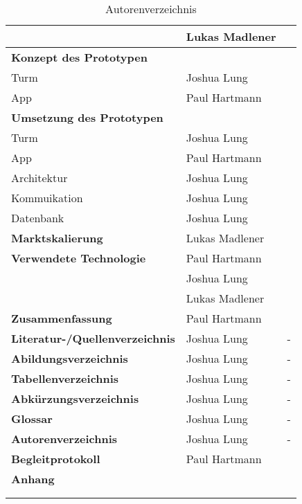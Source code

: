 \begin{longtable}{l|l|r}
                                         & Lukas Madlener &                     \\ \hline
  \textbf{Konzept des Prototypen}        &                &                     \\ \hline
  Turm                                   & Joshua Lung    &                     \\ \hline
  App                                    & Paul Hartmann  &                     \\ \hline
  \textbf{Umsetzung des Prototypen}      &                &                     \\ \hline
  Turm                                   & Joshua Lung    &                     \\ \hline
  App                                    & Paul Hartmann  &                     \\ \hline
  Architektur                            & Joshua Lung    &                     \\ \hline
  Kommuikation                           & Joshua Lung    &                     \\ \hline
  Datenbank                              & Joshua Lung    &                     \\ \hline
  \textbf{Marktskalierung}               & Lukas Madlener &                     \\ \hline
  \textbf{Verwendete Technologie}        & Paul Hartmann  &                     \\
                                         & Joshua Lung    &                     \\
                                         & Lukas Madlener &                     \\ \hline
  \textbf{Zusammenfassung}               & Paul Hartmann  &                     \\ \hline
  \textbf{Literatur-/Quellenverzeichnis} & Joshua Lung    & -                   \\ \hline
  \textbf{Abildungsverzeichnis}          & Joshua Lung    & -                   \\ \hline
  \textbf{Tabellenverzeichnis}           & Joshua Lung    & -                   \\ \hline
  \textbf{Abkürzungsverzeichnis}         & Joshua Lung    & -                   \\ \hline
  \textbf{Glossar}                       & Joshua Lung    & -                   \\ \hline
  \textbf{Autorenverzeichnis}            & Joshua Lung    & -                   \\ \hline
  \textbf{Begleitprotokoll}              & Paul Hartmann  &                     \\ \hline
  \textbf{Anhang}                        &                &                     \\ \hline

  \multicolumn{3}{c}{}                                                          \\

  \caption{Autorenverzeichnis}
  \label{tab:autorenverzeichnis}
\end{longtable}